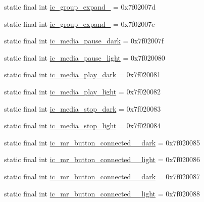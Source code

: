 \begin{CompactItemize}
\item 
static final int \hyperlink{classandroid_1_1support_1_1v7_1_1appcompat_1_1_r_1_1drawable_553a670daa8f5f0c3152c36b2541c479}{ic\_\-group\_\-expand\_} = 0x7f02007d
\item 
static final int \hyperlink{classandroid_1_1support_1_1v7_1_1appcompat_1_1_r_1_1drawable_4599faef3ad58f988cf9f8773ab66f8c}{ic\_\-group\_\-expand\_} = 0x7f02007e
\item 
static final int \hyperlink{classandroid_1_1support_1_1v7_1_1appcompat_1_1_r_1_1drawable_8f42d8a8675ef18c2e3aeb251856145a}{ic\_\-media\_\-pause\_\-dark} = 0x7f02007f
\item 
static final int \hyperlink{classandroid_1_1support_1_1v7_1_1appcompat_1_1_r_1_1drawable_1ed0e925bca60fca382d54fbb7c9db32}{ic\_\-media\_\-pause\_\-light} = 0x7f020080
\item 
static final int \hyperlink{classandroid_1_1support_1_1v7_1_1appcompat_1_1_r_1_1drawable_a8d584a65f8305853d3c05d0674cc525}{ic\_\-media\_\-play\_\-dark} = 0x7f020081
\item 
static final int \hyperlink{classandroid_1_1support_1_1v7_1_1appcompat_1_1_r_1_1drawable_824be9cfafe433ea6da170ca561719cb}{ic\_\-media\_\-play\_\-light} = 0x7f020082
\item 
static final int \hyperlink{classandroid_1_1support_1_1v7_1_1appcompat_1_1_r_1_1drawable_f23d9d884b59427e2745e261c600e41e}{ic\_\-media\_\-stop\_\-dark} = 0x7f020083
\item 
static final int \hyperlink{classandroid_1_1support_1_1v7_1_1appcompat_1_1_r_1_1drawable_71bed6c8d724d0ab0f5ea2726d73b777}{ic\_\-media\_\-stop\_\-light} = 0x7f020084
\item 
static final int \hyperlink{classandroid_1_1support_1_1v7_1_1appcompat_1_1_r_1_1drawable_648371c8db7f338e4c604602d4a7bfb3}{ic\_\-mr\_\-button\_\-connected\_\_\-dark} = 0x7f020085
\item 
static final int \hyperlink{classandroid_1_1support_1_1v7_1_1appcompat_1_1_r_1_1drawable_0ce779042edd8d8b9c2b01f18528fc9b}{ic\_\-mr\_\-button\_\-connected\_\_\-light} = 0x7f020086
\item 
static final int \hyperlink{classandroid_1_1support_1_1v7_1_1appcompat_1_1_r_1_1drawable_b3f9853a84040cd7616bdee362e21869}{ic\_\-mr\_\-button\_\-connected\_\_\-dark} = 0x7f020087
\item 
static final int \hyperlink{classandroid_1_1support_1_1v7_1_1appcompat_1_1_r_1_1drawable_b6bedd40cb462379f0a23c6b38b0ddb5}{ic\_\-mr\_\-button\_\-connected\_\_\-light} = 0x7f020088

\end{CompactItemize}

